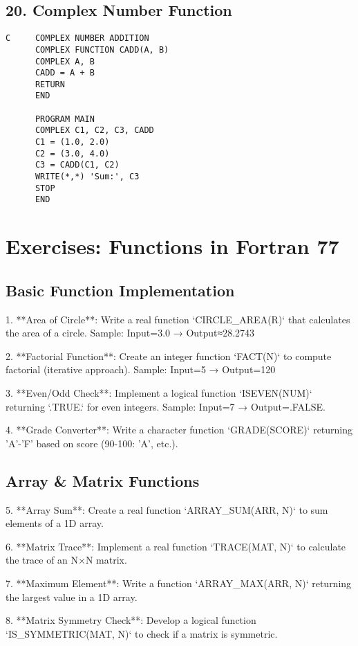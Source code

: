\documentclass{book}
\begin{document}
\subsection*{20. Complex Number Function}
\begin{verbatim}
C     COMPLEX NUMBER ADDITION
      COMPLEX FUNCTION CADD(A, B)
      COMPLEX A, B
      CADD = A + B
      RETURN
      END

      PROGRAM MAIN
      COMPLEX C1, C2, C3, CADD
      C1 = (1.0, 2.0)
      C2 = (3.0, 4.0)
      C3 = CADD(C1, C2)
      WRITE(*,*) 'Sum:', C3
      STOP
      END
\end{verbatim}

\section{Exercises: Functions in Fortran 77}

\subsection{Basic Function Implementation}
1. **Area of Circle**:  
Write a real function `CIRCLE_AREA(R)` that calculates the area of a circle.  
Sample: Input=3.0 → Output≈28.2743  

2. **Factorial Function**:  
Create an integer function `FACT(N)` to compute factorial (iterative approach).  
Sample: Input=5 → Output=120  

3. **Even/Odd Check**:  
Implement a logical function `ISEVEN(NUM)` returning `.TRUE.` for even integers.  
Sample: Input=7 → Output=.FALSE.  

4. **Grade Converter**:  
Write a character function `GRADE(SCORE)` returning 'A'-'F' based on score (90-100: 'A', etc.).  

\subsection*{Array \& Matrix Functions}  
5. **Array Sum**:  
Create a real function `ARRAY_SUM(ARR, N)` to sum elements of a 1D array.  

6. **Matrix Trace**:  
Implement a real function `TRACE(MAT, N)` to calculate the trace of an N×N matrix.  

7. **Maximum Element**:  
Write a function `ARRAY_MAX(ARR, N)` returning the largest value in a 1D array.  

8. **Matrix Symmetry Check**:  
Develop a logical function `IS_SYMMETRIC(MAT, N)` to check if a matrix is symmetric.  
\end{document}
